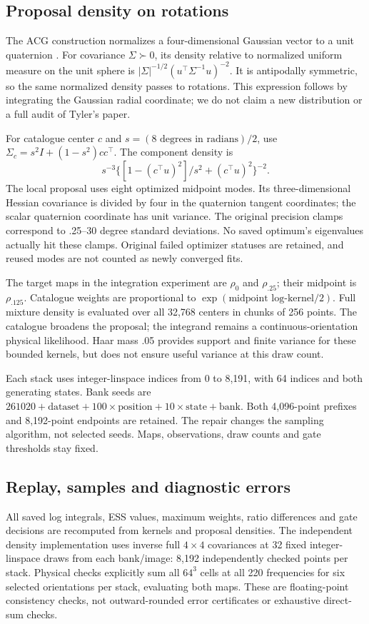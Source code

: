 \subsection{Proposal density on rotations}
The ACG construction normalizes a four-dimensional Gaussian vector to a
unit quaternion \citep{tyler1987}. For covariance $\Sigma\succ0$, its
density relative to normalized uniform measure on the unit sphere is
$|\Sigma|^{-1/2}(u^\top\Sigma^{-1}u)^{-2}$. It is antipodally symmetric,
so the same normalized density passes to rotations. This expression follows
by integrating the Gaussian radial coordinate; we do not claim a new
distribution or a full audit of Tyler's paper.

For catalogue center $c$ and $s=(8\text{ degrees in radians})/2$, use
$\Sigma_c=s^2I+(1-s^2)cc^\top$. The component density is
\begin{equation}
s^{-3}\{[1-(c^\top u)^2]/s^2+(c^\top u)^2\}^{-2}.
\end{equation}
The local proposal uses eight optimized midpoint modes. Its three-dimensional
Hessian covariance is divided by four in the quaternion tangent coordinates;
the scalar quaternion coordinate has unit variance. The original precision
clamps correspond to .25--30 degree standard deviations. No saved optimum's
eigenvalues actually hit these clamps. Original failed optimizer statuses
are retained, and reused modes are not counted as newly converged fits.

The target maps in the integration experiment are $\rho_0$ and $\rho_{.25}$;
their midpoint is $\rho_{.125}$. Catalogue weights are proportional to
$\exp(\text{midpoint log-kernel}/2)$. Full mixture density is evaluated
over all 32,768 centers in chunks of 256 points. The catalogue broadens
the proposal; the integrand remains a continuous-orientation physical
likelihood. Haar mass .05 provides support and finite variance for these
bounded kernels, but does not ensure useful variance at this draw count.

Each stack uses integer-linspace indices from 0 to 8,191, with 64 indices
and both generating states. Bank seeds are
$261020+\text{dataset}+100\times\text{position}+10\times\text{state}
+\text{bank}$. Both 4,096-point prefixes and 8,192-point endpoints are
retained. The repair changes the sampling algorithm, not selected seeds.
Maps, observations, draw counts and gate thresholds stay fixed.

\subsection{Replay, samples and diagnostic errors}
All saved log integrals, ESS values, maximum weights, ratio differences and
gate decisions are recomputed from kernels and proposal densities. The
independent density implementation uses inverse full $4\times4$
covariances at 32 fixed integer-linspace draws from each bank/image:
8,192 independently checked points per stack. Physical checks explicitly
sum all $64^3$ cells at all 220 frequencies for six selected orientations
per stack, evaluating both maps. These are floating-point consistency checks,
not outward-rounded error certificates or exhaustive direct-sum checks.

